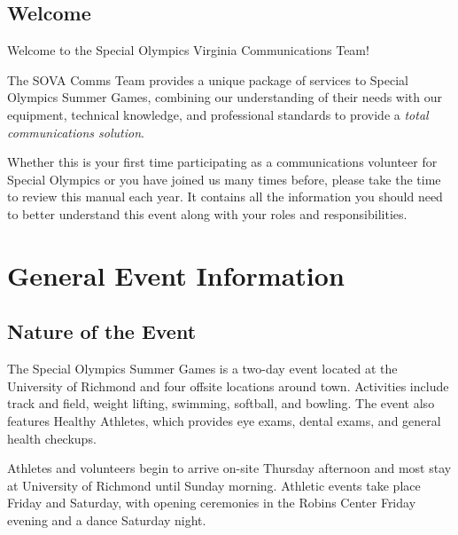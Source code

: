\documentclass[pdflatex,letterpaper,twoside,12pt]{book}
\begin{document}
\section{Welcome}

Welcome to the Special Olympics Virginia Communications Team!

The SOVA Comms Team provides a unique package of services to Special Olympics Summer Games, combining our understanding of their needs with our equipment, technical knowledge, and professional standards to provide a \emph{total communications solution}.

Whether this is your first time participating as a communications volunteer for Special Olympics or you have joined us many times before, please take the time to review this manual each year.  It contains all the information you should need to better understand this event along with your roles and responsibilities.


\chapter{General Event Information}

\section{Nature of the Event}

The Special Olympics Summer Games is a two-day event located at the University of Richmond and four offsite locations around town.  Activities include track and field, weight lifting, swimming, softball, and bowling.  The event also features Healthy Athletes, which provides eye exams, dental exams, and general health checkups.

Athletes and volunteers begin to arrive on-site Thursday afternoon and most stay at University of Richmond until Sunday morning.  Athletic events take place Friday and Saturday, with opening ceremonies in the Robins Center Friday evening and a dance Saturday night.

\end{document}
